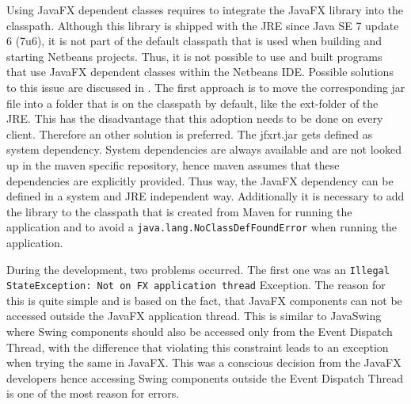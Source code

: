 Using JavaFX dependent classes requires to integrate the JavaFX library into the classpath.
Although this library is shipped with the JRE since Java SE 7 update 6 (7u6), it is not part of the default classpath that is used when building and starting Netbeans projects. Thus, it is not possible to use and built programs that use JavaFX dependent classes within the Netbeans IDE. 
Possible solutions to this issue are discussed in \autocite{impl:fx-classpath}.
The first approach is to move the corresponding jar file into a folder that is on the classpath by default, like the ext-folder of the JRE.
This has the disadvantage that this adoption needs to be done on every client.
Therefore an other  solution is preferred.
The jfxrt.jar  gets defined as system dependency.
System dependencies are always available and are not looked up in the maven specific repository, hence maven assumes that these dependencies are explicitly provided. 
Thus way, the JavaFX dependency can be defined in a system and JRE independent way. 
Additionally it is necessary to add the library to the classpath that is created from Maven for running the application and to avoid a \texttt{java.lang.NoClassDefFoundError} when running the application. 
 
During the development, two problems occurred.
The first one was an \texttt{Illegal} \texttt{StateException: Not on FX application thread} Exception.
The reason for this is quite simple and is based on the fact, that JavaFX components can not be accessed outside the JavaFX application thread.
This is similar to JavaSwing where Swing components should also be accessed only from the Event Dispatch Thread, with the difference that violating this constraint leads to an exception when trying the same in JavaFX.
This was a conscious decision from the JavaFX developers hence accessing Swing components outside the Event Dispatch Thread is one of the most reason for errors.


